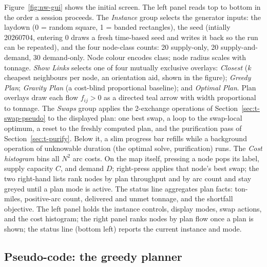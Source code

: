 Figure~\ref{fig:nw-gui} shows the initial screen. The left panel reads
top to bottom in the order a session proceeds. The \emph{Instance} group
selects the generator inputs: the laydown (0 = random square, 1 = banded
rectangles), the seed (intially 20260704, entering 0 draws a fresh time-based seed and
writes it back so the run can be repeated), and the four node-class
counts: 20 supply-only, 20 supply-and-demand, 30 demand-only. 
Node colour encodes class; node radius scales with
tonnage.
\emph{Show Links} selects one of four mutually exclusive
overlays: \emph{Closest} ($k$ cheapest neighbours per node,
an orientation aid, shown in the figure); \emph{Greedy Plan};
\emph{Gravity Plan} (a cost-blind proportional baseline); and
\emph{Optimal Plan}. Plan overlays draw each flow $f_{ij} > 0$ as a
directed teal arrow with width proportional to tonnage. The \emph{Swaps}
group applies the 2-exchange operations of
Section~\ref{sec:t-swap-pseudo} to the displayed plan: one best swap, a
loop to the swap-local optimum, a reset to the freshly computed plan, and
the purification pass of Section~\ref{sec:t-purify}. Below it, a slim
progress bar refills while a background operation of unknowable duration
(the optimal solve, purification) runs. The \emph{Cost histogram} bins
all $N^2$ arc costs. On the map itself, pressing a node pops its label,
supply capacity $C$, and demand $D$; right-press applies that node's best
swap; the two right-hand lists rank nodes by plan throughput and by arc
count and stay greyed until a plan mode is active. The status line
aggregates plan facts: ton-miles, positive-arc count, delivered and unmet
tonnage, and the shortfall objective. The left panel holds the instance controls, display modes, swap
actions, and the cost histogram; the right panel ranks nodes by plan flow
once a plan is shown; the status line (bottom left) reports the current
instance and mode.


\subsection{Pseudo-code: the greedy planner}
\label{sec:t-greedy-pseudo}

